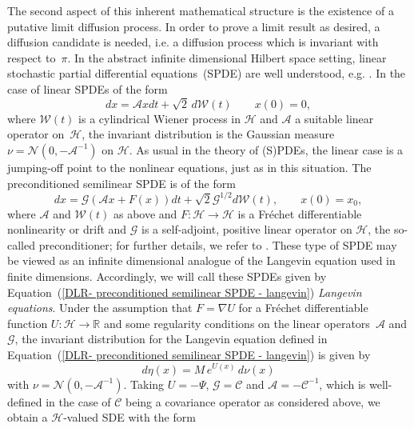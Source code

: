 The second aspect of this inherent mathematical structure is the existence of a putative limit diffusion process. In order to prove a limit result as desired, a diffusion candidate is needed, i.e. a diffusion process which is invariant with respect to~$\pi$. In the abstract infinite dimensional Hilbert space setting, linear stochastic partial differential equations~(SPDE) are well understood, e.g. \autocite{DaPrato1992, Hairer2005, Hairer2007}. In the case of linear SPDEs  of the form
\begin{equation}
 dx =  \mathcal{A} x dt + \sqrt{2} \, d \mathcal{W}(t) \qquad x(0)  =0,
\end{equation}
where $ \mathcal{W}(t) $ is a cylindrical Wiener process in $\mathcal{H}$ and $\mathcal{A}$ a suitable linear operator on~$\mathcal{H}$, the invariant distribution is the Gaussian measure~$ \nu = \mathcal{N}(0, -\mathcal{A}^{-1})$ on $\mathcal{H}$. As usual in the theory of (S)PDEs, the linear case is a jumping-off point to the nonlinear equations, just as in this situation. The preconditioned semilinear SPDE is of the form
\begin{equation}
\label{DLR- preconditioned semilinear SPDE - langevin}
 dx = \mathcal{G} (\mathcal{A}x + F(x))dt + \sqrt{2}\mathcal{G}^{1/2} d\mathcal{W}(t), \qquad x(0) = x_0,
\end{equation}
where $\mathcal{A}$ and $\mathcal{W}(t)$ as above and $F: \mathcal{H} \to \mathcal{H}$ is a Fr\'{e}chet differentiable nonlinearity or drift and $\mathcal{G}$ is a self-adjoint, positive linear operator on $\mathcal{H}$, the so-called preconditioner; for further details, we refer to \autocite{Hairer2005, Hairer2007}. These type of SPDE may be viewed as an infinite dimensional analogue of the Langevin equation used in finite dimensions. Accordingly, we will call these SPDEs given by Equation~(\ref{DLR- preconditioned semilinear SPDE - langevin}) \textit{Langevin equations}. Under the assumption that $F = \nabla U$ for a  Fr\'{e}chet differentiable function $U: \mathcal{H} \to \mathbb{R}$ and some regularity conditions on the linear operators~$\mathcal{A}$ and $\mathcal{G}$, the invariant distribution for the Langevin equation defined in Equation~(\ref{DLR- preconditioned semilinear SPDE - langevin}) is given by 
\begin{equation}
 d \eta (x) = M \, e^{U(x)} \, d \nu (x)
\end{equation}
with $\nu = \mathcal{N}(0, - \mathcal{A}^{-1})$. Taking $U = - \Psi$, $\mathcal{G}= \mathcal{C}$ and $\mathcal{A}= - \mathcal{C}^{-1}$, which is well-defined in the case of $\mathcal{C}$ being a covariance operator as considered above, we obtain a $ \mathcal{H} $-valued SDE with the form
